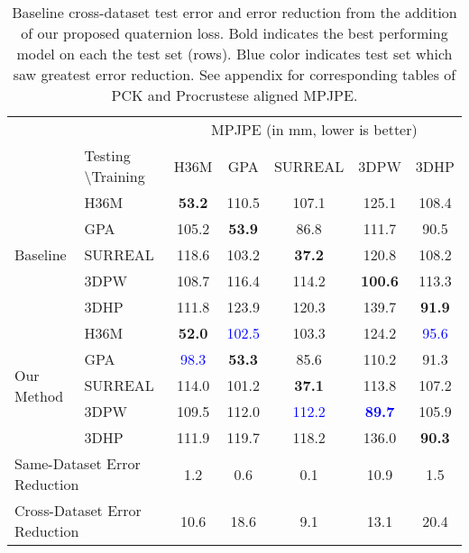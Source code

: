 \documentclass[runningheads]{llncs}
\begin{document}
 \begin{table}[t]
\begin{center}
{\scriptsize
\begin{tabular}{@{}ll c c c c c@{}}
\toprule
 & &\multicolumn{5}{c}{MPJPE (in mm, lower is better)} \\
 & Testing \textbackslash Training & H36M & GPA & SURREAL & 3DPW & 3DHP  \\
\hline
\multirow{5}{*}{Baseline} & H36M & \textbf{53.2} & 110.5 & 107.1 & 125.1  & 108.4\\
&GPA & 105.2 & \textbf{53.9} & 86.8 & 111.7 & 90.5 \\
&SURREAL & 118.6 & 103.2 & \textbf{37.2} & 120.8 & 108.2 \\
&3DPW & 108.7 & 116.4 & 114.2 & \textbf{100.6} & 113.3 \\
&3DHP & 111.8 & 123.9 & 120.3 & 139.7 &  \textbf{91.9} \\
\hline
\multirow{5}{*}{Our Method} & H36M & \textbf{52.0} & \textcolor{blue}{102.5} & 103.3 & 124.2 & \textcolor{blue}{95.6}  \\
& GPA & \textcolor{blue}{98.3} & \textbf{53.3} & 85.6 & 110.2 & 91.3  \\
& SURREAL & 114.0 & 101.2 & \textbf{37.1} & 113.8 & 107.2\\
& 3DPW & 109.5 & 112.0 & \textcolor{blue}{112.2} & \textcolor{blue}{\textbf{89.7}} & 105.9  \\
& 3DHP & 111.9 & 119.7 & 118.2 & 136.0 & \textbf{90.3} \\
\hline
\multicolumn{2}{l}{Same-Dataset Error Reduction } & 1.2 & 0.6 & 0.1 & 10.9 & 1.5 \\
\multicolumn{2}{l}{Cross-Dataset Error Reduction } & 10.6 & 18.6 & 9.1 & 13.1 & 20.4 \\
\bottomrule
\end{tabular}
}
\end{center}
\caption{Baseline cross-dataset test error and error reduction from the addition
of our proposed quaternion loss. Bold indicates the best performing model on 
each the test set (rows). Blue color indicates test set which saw greatest error
reduction. See appendix for corresponding tables of PCK and Procrustese 
aligned MPJPE.}
\label{table:baselineposenet}
\vspace{-0.15in}
\end{table}
\end{document}
